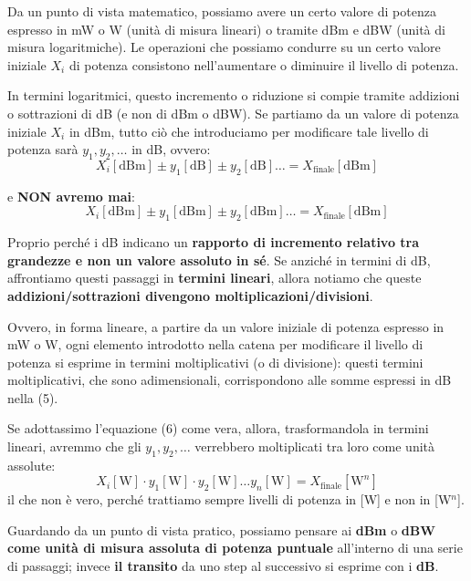 \documentclass[openany,a4paper,12pt]{book}
\begin{document}
Da un punto di vista matematico, possiamo avere un certo valore di potenza espresso in mW o W (unità di misura lineari) o tramite dBm e dBW (unità di misura logaritmiche). Le operazioni che possiamo condurre su un certo valore iniziale $X_i$ di potenza consistono nell'aumentare o diminuire il livello di potenza. 

In termini logaritmici, questo incremento o riduzione si compie tramite addizioni o sottrazioni di dB (e non di dBm o dBW). Se partiamo da un valore di potenza iniziale $X_i$ in dBm, tutto ciò che introduciamo per modificare tale livello di potenza sarà $y_1, y_2, \dots$ in dB, ovvero:
\begin{equation}
    X_i [\text{dBm}] \pm y_1 [\text{dB}] \pm y_2 [\text{dB}] \dots = X_{\text{finale}} [\text{dBm}]
\end{equation}

e \textbf{NON avremo mai}:
\begin{equation}
    X_i [\text{dBm}] \pm y_1 [\text{dBm}] \pm y_2 [\text{dBm}] \dots = X_{\text{finale}} [\text{dBm}]
\end{equation}

Proprio perché i dB indicano un \textbf{rapporto di incremento relativo tra grandezze e non un valore assoluto in sé}. Se anziché in termini di dB, affrontiamo questi passaggi in \textbf{termini lineari}, allora notiamo che queste \textbf{addizioni/sottrazioni divengono moltiplicazioni/divisioni}. 

Ovvero, in forma lineare, a partire da un valore iniziale di potenza espresso in mW o W, ogni elemento introdotto nella catena per modificare il livello di potenza si esprime in termini moltiplicativi (o di divisione): questi termini moltiplicativi, che sono adimensionali, corrispondono alle somme espressi in dB nella (5). 

Se adottassimo l'equazione (6) come vera, allora, trasformandola in termini lineari, avremmo che gli $y_1, y_2, \dots$ verrebbero moltiplicati tra loro come unità assolute:
\begin{equation*}
    X_i [\text{W}] \cdot y_1 [\text{W}] \cdot y_2 [\text{W}] \dots y_n [\text{W}] = X_{\text{finale}} [\text{W}^n]
\end{equation*}
il che non è vero, perché trattiamo sempre livelli di potenza in [W] e non in [W$^n$].

Guardando da un punto di vista pratico, possiamo pensare ai \textbf{dBm} o \textbf{dBW come unità di misura assoluta di potenza puntuale} all'interno di una serie di passaggi; invece \textbf{il transito} da uno step al successivo si esprime con i \textbf{dB}. 
\end{document}
